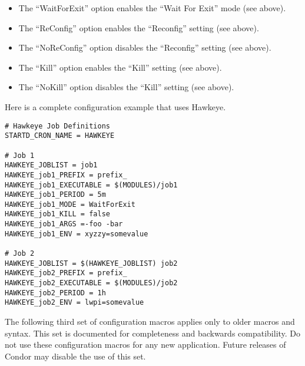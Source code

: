 \begin{description}
   \begin{itemize}

	\item The ``WaitForExit'' option enables the ``Wait For Exit''
	mode (see above).

	\item The ``ReConfig'' option enables the ``Reconfig'' setting
	(see above).

	\item The ``NoReConfig'' option disables the ``Reconfig'' setting
	(see above).

	\item The ``Kill'' option enables the ``Kill'' setting (see
	above).

	\item The ``NoKill'' option disables the ``Kill'' setting (see
	above).

    \end{itemize}

\end{description}
Here is a complete configuration example that uses Hawkeye.
\begin{verbatim}
# Hawkeye Job Definitions
STARTD_CRON_NAME = HAWKEYE

# Job 1
HAWKEYE_JOBLIST = job1
HAWKEYE_job1_PREFIX = prefix_
HAWKEYE_job1_EXECUTABLE = $(MODULES)/job1
HAWKEYE_job1_PERIOD = 5m
HAWKEYE_job1_MODE = WaitForExit
HAWKEYE_job1_KILL = false
HAWKEYE_job1_ARGS =-foo -bar
HAWKEYE_job1_ENV = xyzzy=somevalue

# Job 2
HAWKEYE_JOBLIST = $(HAWKEYE_JOBLIST) job2
HAWKEYE_job2_PREFIX = prefix_
HAWKEYE_job2_EXECUTABLE = $(MODULES)/job2
HAWKEYE_job2_PERIOD = 1h
HAWKEYE_job2_ENV = lwpi=somevalue
\end{verbatim}


The following 
third set of configuration macros applies only to older
macros and syntax.
This set is documented for completeness and backwards
compatibility.
Do not use these configuration macros for any new application.
Future releases of Condor may disable the use of this set.

